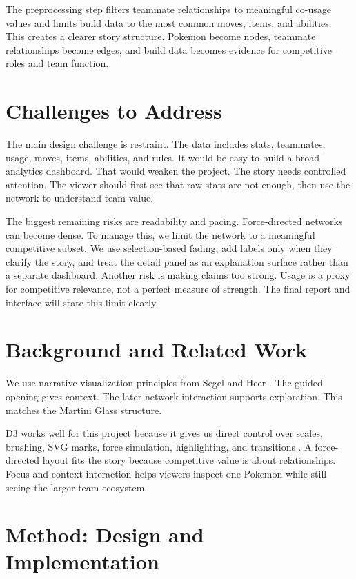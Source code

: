 \documentclass[11pt]{article}
\begin{document}
The preprocessing step filters teammate relationships to meaningful co-usage values and limits build data to the most common moves, items, and abilities. This creates a clearer story structure. Pokemon become nodes, teammate relationships become edges, and build data becomes evidence for competitive roles and team function.

\section{Challenges to Address}

The main design challenge is restraint. The data includes stats, teammates, usage, moves, items, abilities, and rules. It would be easy to build a broad analytics dashboard. That would weaken the project. The story needs controlled attention. The viewer should first see that raw stats are not enough, then use the network to understand team value.

The biggest remaining risks are readability and pacing. Force-directed networks can become dense. To manage this, we limit the network to a meaningful competitive subset. We use selection-based fading, add labels only when they clarify the story, and treat the detail panel as an explanation surface rather than a separate dashboard. Another risk is making claims too strong. Usage is a proxy for competitive relevance, not a perfect measure of strength. The final report and interface will state this limit clearly.

\section{Background and Related Work}

We use narrative visualization principles from Segel and Heer \cite{segel2010narrative}. The guided opening gives context. The later network interaction supports exploration. This matches the Martini Glass structure.

D3 works well for this project because it gives us direct control over scales, brushing, SVG marks, force simulation, highlighting, and transitions \cite{d3js}. A force-directed layout fits the story because competitive value is about relationships. Focus-and-context interaction helps viewers inspect one Pokemon while still seeing the larger team ecosystem.

\section{Method: Design and Implementation}
\end{document}
